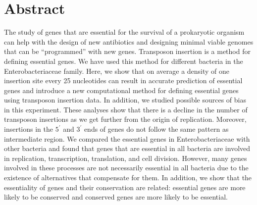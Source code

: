 \documentclass[12pt,letterpaper]{article}
\begin{document}
\section{Abstract}
The study of genes that are essential for the survival of a prokaryotic organism can help with the design of new antibiotics and designing minimal viable genomes that can be ``programmed'' with new genes. Transposon insertion is a method for defining essential genes. We have used this method for different bacteria in the Enterobacteriaceae family. Here, we show that on average a density of one insertion site every 25 nucleotides can result in accurate prediction of essential genes and introduce a new computational method for defining essential genes using transposon insertion data. In addition, we studied possible sources of bias in this experiment. These analyses show that there is a decline in the number of transposon insertions as we get further from the origin of replication. Moreover, insertions in the $5^\prime$ and $3^\prime$ ends of genes do not follow the same pattern as intermediate region. We compared the essential genes in Enterobacteriaceae with other bacteria and found that genes that are essential in all bacteria are involved in replication, transcription, translation, and cell division. However, many genes involved in these processes are not necessarily essential in all bacteria due to the existence of alternatives that compensate for them. In addition, we show that the essentiality of genes and their conservation are related: essential genes are more likely to be conserved and conserved genes are more likely to be essential.
\end{document}
